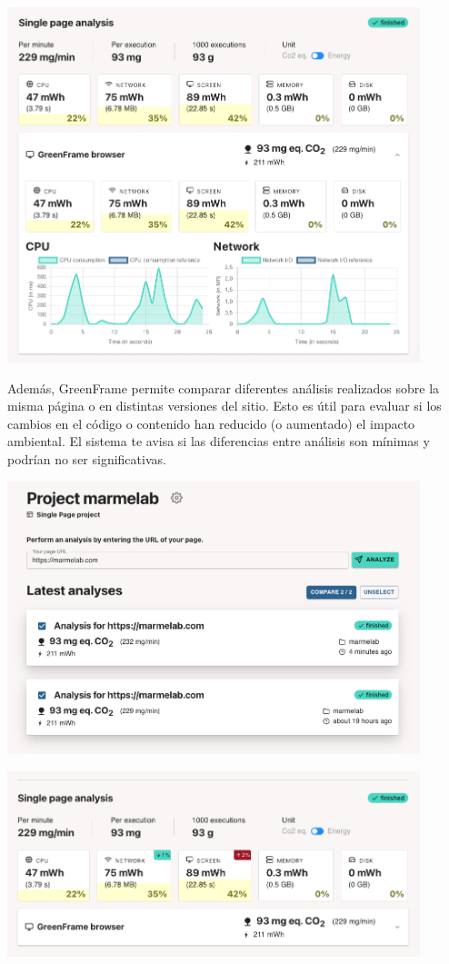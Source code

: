 \documentclass[12pt,a4paper]{report}
\begin{document}
\begin{center}
  \includegraphics[width=0.9\textwidth]{imagenes/Greenframe_6.png}
\end{center}

Además, GreenFrame permite comparar diferentes análisis realizados sobre la
misma página o en distintas versiones del sitio. Esto es útil para evaluar si
los cambios en el código o contenido han reducido (o aumentado) el impacto
ambiental. El sistema te avisa si las diferencias entre análisis son mínimas y
podrían no ser significativas.

\begin{center}
  \includegraphics[width=0.9\textwidth]{imagenes/Greenframe_7.png}
\end{center}

\begin{center}
  \includegraphics[width=0.9\textwidth]{imagenes/Greenframe_8.png}
\end{center}
\end{document}
